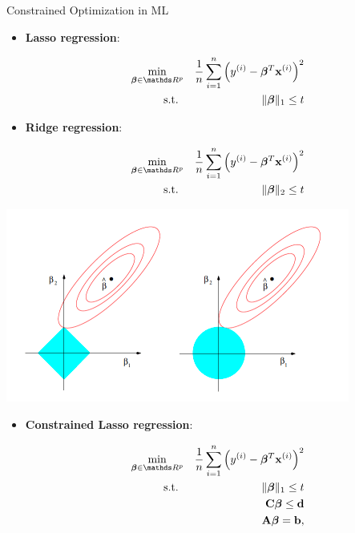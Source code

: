 \documentclass[11pt,compress,t,notes=noshow, xcolor=table]{beamer}
\begin{document}
\begin{vbframe}{Constrained Optimization in ML}

\begin{itemize}
\item \textbf{Lasso regression}:

\begin{eqnarray*}
\min_{\bm{\beta}\in \R^p} && \frac{1}{n}\sum_{i = 1}^n\left(y^{(i)} - \bm{\beta}^T\xv^{(i)}\right)^2 \\
\text{s.t. } && \|\bm{\beta}\|_1 \le t
\end{eqnarray*}

\item \textbf{Ridge regression}:

\begin{eqnarray*}
\min_{\bm{\beta}\in \R^p} && \frac{1}{n}\sum_{i = 1}^n\left(y^{(i)} - \bm{\beta}^T\xv^{(i)}\right)^2 \\
\text{s.t. } &&\|\bm{\beta}\|_2 \le t
\end{eqnarray*}
\end{itemize}

\begin{center}
	\includegraphics{figure_man/lasso-ridge.png}
\end{center}

\framebreak


\begin{itemize}
\item \textbf{Constrained Lasso regression}:

\begin{eqnarray*}
\min_{\bm{\beta}\in \R^p} && \frac{1}{n}\sum_{i = 1}^n\left(y^{(i)} - \bm{\beta}^T\xv^{(i)}\right)^2 \\
\text{s.t. } && \|\bm{\beta}\|_1 \le t\\
             && \mathbf{C}\bm{\beta} \le \mathbf{d}\\
             && \Amat\bm{\beta} = \mathbf{b}, 
\end{eqnarray*}
\end{itemize}


\end{vbframe}
\end{document}
